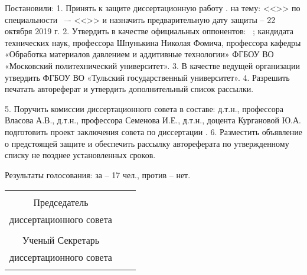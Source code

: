 Постановили:
1. Принять к защите диссертационную работу \thesisAuthorLastNameFrom. на тему: <<\thesisTitle>> по специальности \thesisSpecialtyNumber\ –- <<\thesisSpecialtyTitle>> и назначить предварительную дату защиты – 22 октября 2019 г.
2. Утвердить в качестве официальных оппонентов:
\opponentOneWhomRegalia\ \opponentOneWhomFio;
кандидата технических наук, профессора Шпунькина Николая Фомича, профессора кафедры «Обработка материалов давлением и аддитивные технологии» ФГБОУ ВО «Московский политехнический университет».
3. В качестве ведущей организации утвердить ФГБОУ ВО «Тульский государственный университет».
4. Разрешить печатать автореферат и утвердить дополнительный список рассылки.

5. Поручить комиссии диссертационного совета в составе: д.т.н., профессора Власова А.В., д.т.н., профессора Семенова И.Е., д.т.н., доцента Кургановой Ю.А. подготовить проект заключения совета по диссертации \thesisAuthorLastNameFrom.
6. Разместить объявление о предстоящей защите и обеспечить рассылку автореферата по утвержденному списку не позднее установленных сроков.

Результаты голосования: за – 17 чел., против – нет.

\begin{center}
	\begin{tabular}[c]{c m{4cm} l}
		                        &            &                     \\
		     Председатель       &            &                     \\
		диссертационного совета & \hrulefill & \dcHeadFullFIO      \\
		    \dcHeadRegalia      &            &                     \\
		   Ученый Секретарь     &            &                     \\
		диссертационного совета & \hrulefill & \dcSecretaryFullFIO \\
		  \dcSecretaryRegalia   &            &
	\end{tabular}
\end{center}

\clearpage